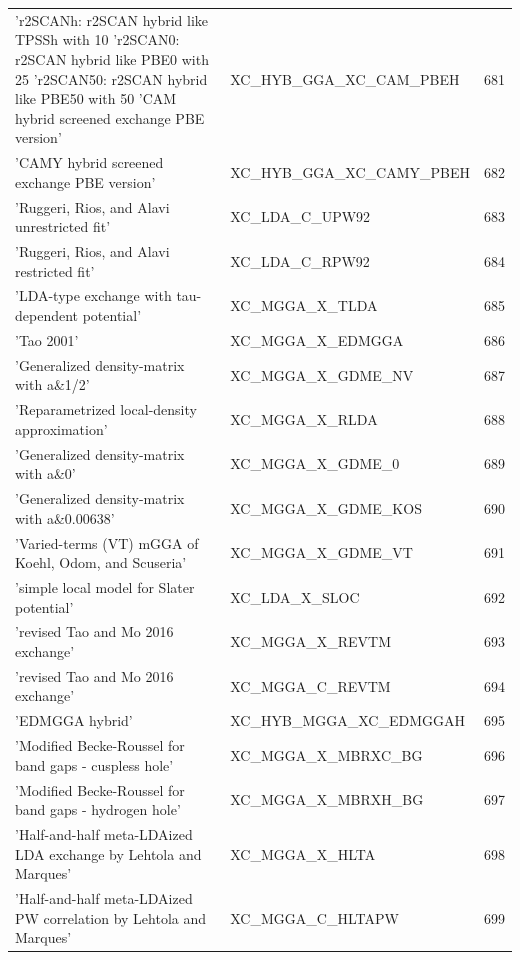 \documentclass[final,12pt,makeidx,DIV=calc]{article}
\begin{document}
{{{{{{\begin{table}[!h]
\begin{center}
\begin{tabular}{llr}
  'r2SCANh: r2SCAN hybrid like TPSSh with 10%
  'r2SCAN0: r2SCAN hybrid like PBE0 with 25%
  'r2SCAN50: r2SCAN hybrid like PBE50 with 50%
  'CAM hybrid screened exchange PBE version' & XC\_HYB\_GGA\_XC\_CAM\_PBEH  &681\\
  'CAMY hybrid screened exchange PBE version' & XC\_HYB\_GGA\_XC\_CAMY\_PBEH  &682\\
  'Ruggeri, Rios, and Alavi unrestricted fit' & XC\_LDA\_C\_UPW92  &683\\
  'Ruggeri, Rios, and Alavi restricted fit' & XC\_LDA\_C\_RPW92  &684\\
  'LDA-type exchange with tau-dependent potential' & XC\_MGGA\_X\_TLDA  &685\\
  'Tao 2001' & XC\_MGGA\_X\_EDMGGA  &686\\
  'Generalized density-matrix with a\&1/2' & XC\_MGGA\_X\_GDME\_NV  &687\\
  'Reparametrized local-density approximation' & XC\_MGGA\_X\_RLDA  &688\\
  'Generalized density-matrix with a\&0' & XC\_MGGA\_X\_GDME\_0  &689\\
  'Generalized density-matrix with a\&0.00638' & XC\_MGGA\_X\_GDME\_KOS  &690\\
  'Varied-terms (VT) mGGA of Koehl, Odom, and Scuseria' & XC\_MGGA\_X\_GDME\_VT  &691\\
  'simple local model for Slater potential' & XC\_LDA\_X\_SLOC  &692\\
  'revised Tao and Mo 2016 exchange' & XC\_MGGA\_X\_REVTM  &693\\
  'revised Tao and Mo 2016 exchange' & XC\_MGGA\_C\_REVTM  &694\\
  'EDMGGA hybrid' & XC\_HYB\_MGGA\_XC\_EDMGGAH  &695\\
  'Modified Becke-Roussel for band gaps - cuspless hole' & XC\_MGGA\_X\_MBRXC\_BG  &696\\
  'Modified Becke-Roussel for band gaps - hydrogen hole' & XC\_MGGA\_X\_MBRXH\_BG  &697\\
  'Half-and-half meta-LDAized LDA exchange by Lehtola and Marques' & XC\_MGGA\_X\_HLTA  &698\\
  'Half-and-half meta-LDAized PW correlation by Lehtola and Marques' & XC\_MGGA\_C\_HLTAPW  &699\\

\end{tabular}
\end{center}
\end{table}}}}}}}
\end{document}
